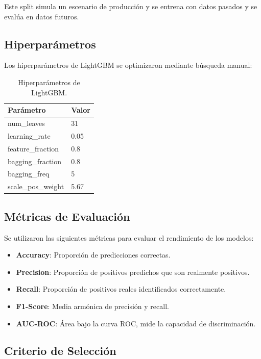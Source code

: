Este split simula un escenario de producción y se entrena con datos pasados y se evalúa en datos futuros.

\subsection{Hiperparámetros}

Los hiperparámetros de LightGBM se optimizaron mediante búsqueda manual:

\begin{table}[h!]
    \centering
    \begin{tabular}{|l|l|}
    \hline
        \textbf{Parámetro} & \textbf{Valor} \\
        \hline num\_leaves & 31 \\
        \hline learning\_rate & 0.05 \\
        \hline feature\_fraction & 0.8 \\
        \hline bagging\_fraction & 0.8 \\
        \hline bagging\_freq & 5 \\
        \hline scale\_pos\_weight & 5.67 \\
        \hline
        \end{tabular}
    \caption{Hiperparámetros de LightGBM.}    
\end{table}

\subsection{Métricas de Evaluación}

Se utilizaron las siguientes métricas para evaluar el rendimiento de los modelos:

\begin{itemize}
    \item \textbf{Accuracy}: Proporción de predicciones correctas.
    \item \textbf{Precision}: Proporción de positivos predichos que son realmente positivos.
    \item \textbf{Recall}: Proporción de positivos reales identificados correctamente.
    \item \textbf{F1-Score}: Media armónica de precisión y recall.
    \item \textbf{AUC-ROC}: Área bajo la curva ROC, mide la capacidad de discriminación.
\end{itemize}

\subsection{Criterio de Selección}

